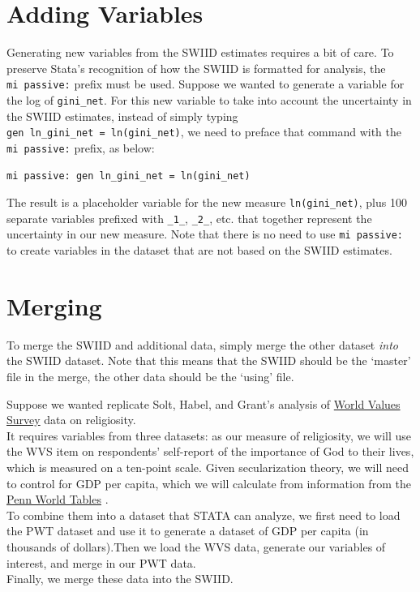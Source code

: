 \documentclass[11pt,]{article}
\theoremstyle{definition}
\theoremstyle{definition}
\theoremstyle{remark}
\begin{document}
\section{Adding Variables}\label{adding-variables}

Generating new variables from the SWIID estimates requires a bit of
care. To preserve Stata's recognition of how the SWIID is formatted for
analysis, the \texttt{mi\ passive:} prefix must be used. Suppose we
wanted to generate a variable for the log of \texttt{gini\_net}. For
this new variable to take into account the uncertainty in the SWIID
estimates, instead of simply typing
\texttt{gen\ ln\_gini\_net\ =\ ln(gini\_net)}, we need to preface that
command with the \texttt{mi\ passive:} prefix, as below:

\begin{verbatim}
mi passive: gen ln_gini_net = ln(gini_net)
\end{verbatim}

The result is a placeholder variable for the new measure
\texttt{ln(gini\_net)}, plus 100 separate variables prefixed with
\texttt{\_1\_}, \texttt{\_2\_}, etc. that together represent the
uncertainty in our new measure. Note that there is no need to use
\texttt{mi\ passive:} to create variables in the dataset that are not
based on the SWIID estimates.

\section{Merging}\label{merging}

To merge the SWIID and additional data, simply merge the other dataset
\emph{into} the SWIID dataset. Note that this means that the SWIID
should be the `master' file in the merge, the other data should be the
`using' file.

Suppose we wanted replicate Solt, Habel, and Grant's analysis
\citeyearpar{Solt2011} of \href{http://worldvaluessurvey.org}{World
Values Survey} data on religiosity.\\
It requires variables from three datasets: as our measure of
religiosity, we will use the WVS item on respondents' self-report of the
importance of God to their lives, which is measured on a ten-point
scale. Given secularization theory, we will need to control for GDP per
capita, which we will calculate from information from the
\href{http://www.ggdc.net/pwt}{Penn World Tables}
\citep{Feenstra2015}.\\
To combine them into a dataset that STATA can analyze, we first need to
load the PWT dataset and use it to generate a dataset of GDP per capita
(in thousands of dollars).Then we load the WVS data, generate our
variables of interest, and merge in our PWT data.\\
Finally, we merge these data into the SWIID.
\end{document}

